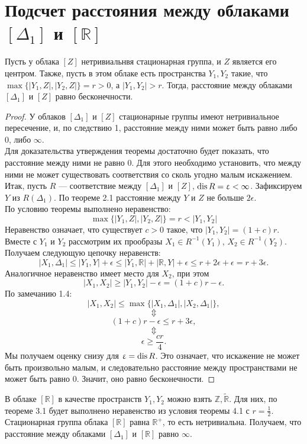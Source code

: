 
\section{Подсчет расстояния между облаками $[\Delta_1]$ и $[\mathbb{R}]$}

\begin{theorem} Пусть у облака $[Z]$ нетривиальнвя стационарная группа, и $Z$
является его центром. Также, пусть в этом облаке есть пространства $Y_{1}, Y_{2}$
такие, что $\max\big\{ |Y_{1},Z|, |Y_{2}, Z| \big\} = r>0$, а
$|Y_{1}, Y_{2}|>r$. Тогда, расстояние между облаками $[\Delta_1]$ и $[Z]$
равно бесконечности.
\end{theorem} 
\begin{proof} У облаков $[\Delta_1]$ и $[Z]$ стационарные группы имеют
нетривиальное пересечение, и, по следствию 1, расстояние между ними может быть
равно либо $0$, либо $\infty$. \\ Для доказательства утверждения теоремы
достаточно будет показать, что расстояние между ними не равно $0$.  Для этого
необходимо установить, что между ними не может существовать соответствия со
сколь угодно малым искажением. Итак, пусть $R$ --- соответствие между
$[\Delta_1]$ и $[Z]$, $\operatorname{dis} R = \upvarepsilon < \infty$.
Зафиксируем $Y$ из $R(\Delta_1)$. По теореме 2.1 расстояние между $Y$ и $Z$ не
больше $2\epsilon$.\\ По условию теоремы выполнено неравенство:
 $$\max\big\{ |Y_{1},Z|, |Y_{2}, Z| \big\} = r < |Y_{1}, Y_{2}|$$
Неравенство означает, что существует $c > 0$ такое, что
$|Y_{1},Y_{2}| = (1 + c)r.$ \\ Вместе с $Y_{1}$ и
$ Y_{2}$ рассмотрим их прообразы $X_1 \in R^{-1}(Y_{1})$,
$ X_2 \in R^{-1}(Y_{2})$.  \\ Получаем следующую цепочку
неравенств:
	$$|X_1, \Delta_1| \le |Y_{1}, Y| + \epsilon \le |Y_{1}, \mathbb{R}| + |\mathbb{R}, Y| +\epsilon \le r + 2\epsilon + \epsilon = r + 3\epsilon.$$
	Аналогичное неравенство имеет место для $X_2$, при этом
	$$|X_1, X_2|  \ge |Y_{1}, Y_{2}| - \epsilon = (1+c)r - \epsilon.$$
	По замечанию 1.4:
	$$|X_1, X_2| \le \max\big\{ |X_1, \Delta_1|, |X_2, \Delta_1| \big\},$$
	$$\Updownarrow$$
	$$(1+c)r - \epsilon\le r + 3\epsilon,$$
	$$\Updownarrow$$
	$$\epsilon \ge \frac{cr}{4}.$$
	Мы получаем оценку снизу для $\upvarepsilon = \operatorname{dis} R$. Это означает, что
искажение не может быть произвольно малым, и следовательно расстояние между
пространствами не может быть равно 0. Значит, оно равно бесконечности.
	
\end{proof}
\begin{corollary}
	В облаке $[\mathbb{R}]$ в качестве пространств $Y_{1}, Y_{2}$ можно взять
$\mathbb{Z}, \widetilde{\mathbb{R}}$. Для них, по теореме 3.1 будет выполнено
неравенство из условия теоремы 4.1 с $r = \frac 1 2$. Стационарная группа облака
$[\mathbb{R}]$ равна $\mathbb{R}^{+}$, то есть нетривиальна. Получаем, что расстояние между облаками
$[\Delta_{1}]$ и $[\mathbb{R}]$ равно $\infty$.
\end{corollary}
